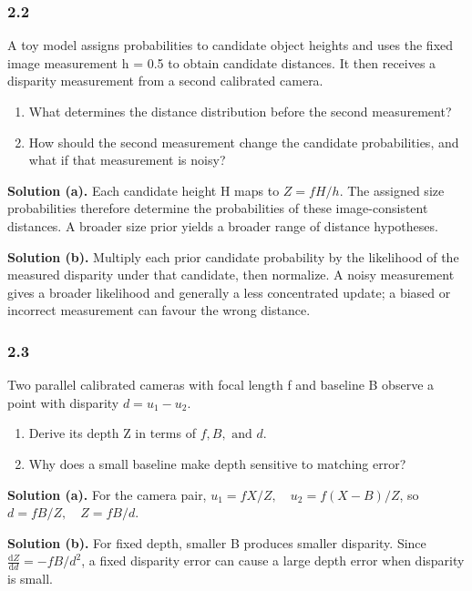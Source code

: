 \documentclass[11pt,a4paper]{article}
\begin{document}
\begin{minipage}{\linewidth}
\subsubsection*{2.2}
A toy model assigns probabilities to candidate object heights and uses the fixed image measurement h = 0.5 to obtain candidate distances.
It then receives a disparity measurement from a second calibrated camera.
\begin{enumerate}[label=(\alph*),nosep]
\item What determines the distance distribution before the second measurement?
\item How should the second measurement change the candidate probabilities, and what if that measurement is noisy?
\end{enumerate}
\noindent\textbf{Solution (a).} Each candidate height H maps to $Z=fH/h$.
The assigned size probabilities therefore determine the probabilities of these image-consistent distances.
A broader size prior yields a broader range of distance hypotheses.

\noindent\textbf{Solution (b).} Multiply each prior candidate probability by the likelihood of the measured disparity under that candidate, then normalize.
A noisy measurement gives a broader likelihood and generally a less concentrated update; a biased or incorrect measurement can favour the wrong distance.
\end{minipage}
\par\medskip
\par
\noindent
\begin{minipage}{\linewidth}
\subsubsection*{2.3}
Two parallel calibrated cameras with focal length f and baseline B observe a point with disparity $d=u_1-u_2$.
\begin{enumerate}[label=(\alph*),nosep]
\item Derive its depth Z in terms of $f,B,\text{ and }d$.
\item Why does a small baseline make depth sensitive to matching error?
\end{enumerate}
\noindent\textbf{Solution (a).} For the camera pair, $u_1=fX/Z,\quad u_2=f(X-B)/Z$, so $d=fB/Z,\quad Z=fB/d$.

\noindent\textbf{Solution (b).} For fixed depth, smaller B produces smaller disparity.
Since $\frac{\mathrm d Z}{\mathrm d d}=-fB/d^2$, a fixed disparity error can cause a large depth error when disparity is small.
\end{minipage}
\end{document}
